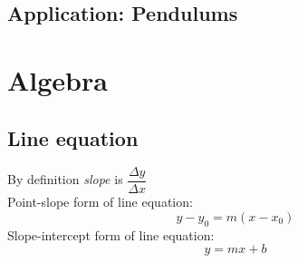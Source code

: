 \documentclass[12pt, a4paper]{scrartcl}
\begin{document}
\subsection{Application: Pendulums}
\label{sec:application:pendulums}

\newpage

\appendix

\section{Algebra}
\label{appendix:algebra}

\subsection{Line equation}
\label{appendix:algebra:line_equation}

By definition \textit{slope} is $\dfrac{\Delta y}{\Delta x}$\\
Point-slope form of line equation: $$y - y_0 = m (x - x_0)$$
Slope-intercept form of line equation: $$y = mx + b$$
\end{document}
